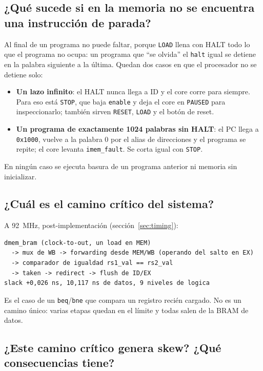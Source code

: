 \subsection{¿Qué sucede si en la memoria no se encuentra una instrucción de parada?}

Al final de un programa no puede faltar, porque \texttt{LOAD} llena con HALT todo lo que el
programa no ocupa: un programa que ``se olvida'' el \texttt{halt} igual se detiene en la palabra
siguiente a la última. Quedan dos casos en que el procesador no se detiene solo:

\begin{itemize}[nosep]
  \item \textbf{Un lazo infinito}: el HALT nunca llega a ID y el core corre para siempre. Para eso
        está \texttt{STOP}, que baja \texttt{enable} y deja el core en \texttt{PAUSED} para
        inspeccionarlo; también sirven \texttt{RESET}, \texttt{LOAD} y el botón de reset.
  \item \textbf{Un programa de exactamente 1024 palabras sin HALT}: el PC llega a \texttt{0x1000},
        vuelve a la palabra 0 por el alias de direcciones y el programa se repite; el core levanta
        \texttt{imem\_fault}. Se corta igual con \texttt{STOP}.
\end{itemize}

En ningún caso se ejecuta basura de un programa anterior ni memoria sin inicializar.

\subsection{¿Cuál es el camino crítico del sistema?}

A \qty{92}{\mega\hertz}, post-implementación (sección~\ref{sec:timing}):

\begin{lstlisting}[style=verilog,numbers=none]
dmem_bram (clock-to-out, un load en MEM)
  -> mux de WB -> forwarding desde MEM/WB (operando del salto en EX)
  -> comparador de igualdad rs1_val == rs2_val
  -> taken -> redirect -> flush de ID/EX
slack +0,026 ns, 10,117 ns de datos, 9 niveles de logica
\end{lstlisting}

Es el caso de un \texttt{beq}/\texttt{bne} que compara un registro recién cargado. No es un camino
único: varias etapas quedan en el límite y todas salen de la BRAM de datos.

\subsection{¿Este camino crítico genera skew? ¿Qué consecuencias tiene?}

